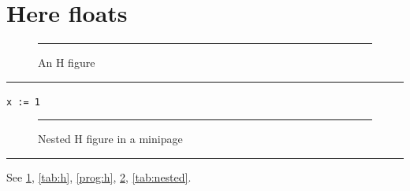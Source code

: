 \documentclass{article}
\begin{document}
\listoffigures
\listoftables
{}
\section{Here floats}
\begin{figure}[H]
\centering\rule{3cm}{1cm}
\caption{An H figure}\label{fig:h}
\end{figure}
\begin{table}[H]
\caption{A boxed H table}\label{tab:h}
\centering\rule{3cm}{1cm}
\end{table}
\begin{program}[H]
\caption{A ruled program}\label{prog:h}
\texttt{x := 1}
\end{program}
\noindent\begin{minipage}{.45\linewidth}
\begin{figure}[H]
\centering\rule{2cm}{1cm}
\caption{Nested H figure in a minipage}\label{fig:nested}
\end{figure}
\end{minipage}\hfill
\begin{minipage}{.45\linewidth}
\begin{table}[H]
\caption{Nested H table in a minipage}\label{tab:nested}
\centering\rule{2cm}{1cm}
\end{table}
\end{minipage}
See \ref{fig:h}, \ref{tab:h}, \ref{prog:h}, \ref{fig:nested}, \ref{tab:nested}.
\end{document}
